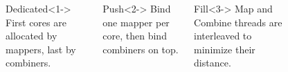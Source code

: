 \begin{frame}[t]
\begin{columns}[t]
\begin{figure}[h]
		\label{fig:thread-to-cpu-policies}
	\end{figure}
	\vspace{-20pt}
	\begin{block}{Dedicated}<1->
		First cores are allocated by mappers, last by combiners.
	\end{block}
	\vspace{10pt}
	\begin{block}{Push}<2->
		Bind one mapper per core, then bind combiners on top.
	\end{block}
	\vspace{12pt}
	\begin{block}{Fill}<3->
		Map and Combine threads are interleaved to minimize their distance.
	\end{block}
	\end{columns}

\end{frame}

